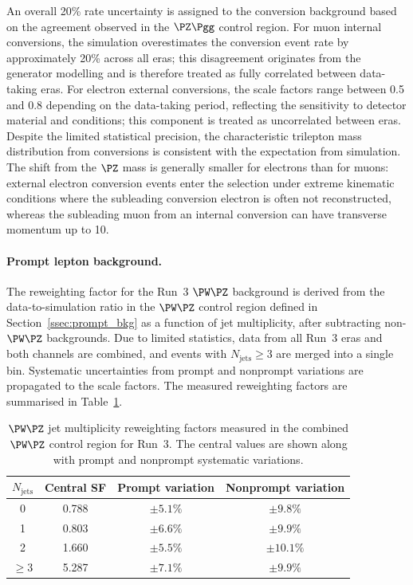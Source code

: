 An overall 20\% rate uncertainty is assigned to the conversion background based on the agreement observed in the $\PZ\Pgg$ control region. For muon internal conversions, the simulation overestimates the conversion event rate by approximately 20\% across all eras; this disagreement originates from the generator modelling and is therefore treated as fully correlated between data-taking eras. For electron external conversions, the scale factors range between 0.5 and 0.8 depending on the data-taking period, reflecting the sensitivity to detector material and conditions; this component is treated as uncorrelated between eras. Despite the limited statistical precision, the characteristic trilepton mass distribution from conversions is consistent with the expectation from simulation. The shift from the $\PZ$ mass is generally smaller for electrons than for muons: external electron conversion events enter the selection under extreme kinematic conditions where the subleading conversion electron is often not reconstructed, whereas the subleading muon from an internal conversion can have transverse momentum up to 10\GeV.

\paragraph{Prompt lepton background.}
The reweighting factor for the Run~3 $\PW\PZ$ background is derived from the data-to-simulation ratio in the $\PW\PZ$ control region defined in Section~\ref{ssec:prompt_bkg} as a function of jet multiplicity, after subtracting non-$\PW\PZ$ backgrounds. Due to limited statistics, data from all Run~3 eras and both channels are combined, and events with $N_{\text{jets}} \geq 3$ are merged into a single bin. Systematic uncertainties from prompt and nonprompt variations are propagated to the scale factors. The measured reweighting factors are summarised in Table~\ref{tab:wz_njet_sf}.

\begin{table}[htbp]
  \centering
  \begin{tabular}{cccc}
    \hline
    $N_{\text{jets}}$ & Central SF & Prompt variation & Nonprompt variation \\
    \hline
    0        & 0.788 & $\pm 5.1\%$ & $\pm 9.8\%$ \\
    1        & 0.803 & $\pm 6.6\%$ & $\pm 9.9\%$ \\
    2        & 1.660 & $\pm 5.5\%$ & $\pm 10.1\%$ \\
    $\geq 3$ & 5.287 & $\pm 7.1\%$ & $\pm 9.9\%$ \\
    \hline
  \end{tabular}
  \caption{$\PW\PZ$ jet multiplicity reweighting factors measured in the combined $\PW\PZ$ control region for Run~3. The central values are shown along with prompt and nonprompt systematic variations.}
  \label{tab:wz_njet_sf}
\end{table}

